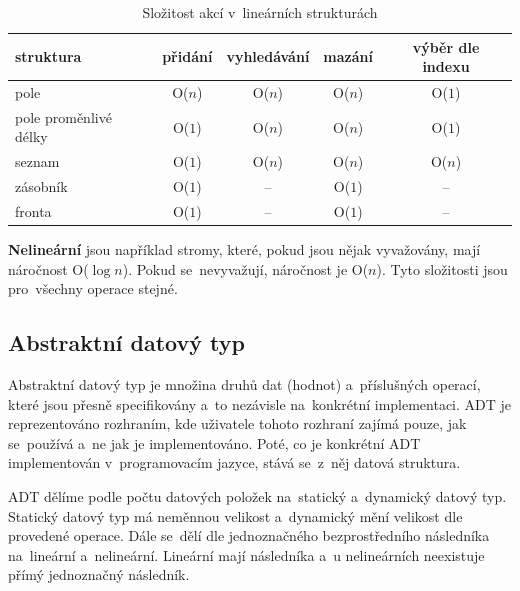 \begin{table}[h]
	\centering
	\caption{Složitost akcí v~lineárních strukturách}
	\begin{tabular}{|l||c|c|c|c|}\hline
		struktura             & přidání    & vyhledávání & mazání     & výběr dle indexu \\\hline\hline
		pole                  & O(\( n \)) & O(\( n \))  & O(\( n \)) & O(\( 1 \))       \\\hline
		pole proměnlivé délky & O(\( 1 \)) & O(\( n \))  & O(\( n \)) & O(\( 1 \))       \\\hline
		seznam                & O(\( 1 \)) & O(\( n \))  & O(\( n \)) & O(\( n \))       \\\hline
		zásobník              & O(\( 1 \)) & --          & O(\( 1 \)) & --               \\\hline
		fronta                & O(\( 1 \)) & --          & O(\( 1 \)) & --               \\\hline
	\end{tabular}
\end{table}

\textbf{Nelineární} jsou například stromy, které, pokud jsou nějak vyvažovány, mají náročnost O(\( \log{n} \)). Pokud se~nevyvažují, náročnost je O(\( n \)). Tyto složitosti jsou pro~všechny operace stejné.


\subsection{Abstraktní datový typ}

Abstraktní datový typ je množina druhů dat (hodnot) a~příslušných operací, které jsou přesně specifikovány a~to nezávisle na~konkrétní implementaci. ADT je reprezentováno rozhraním, kde uživatele tohoto rozhraní zajímá pouze, jak se~používá a~ne jak je implementováno. Poté, co je konkrétní ADT implementován v~programovacím jazyce, stává se~z~něj datová struktura.

ADT dělíme podle počtu datových položek na~statický a~dynamický datový typ. Statický datový typ má neměnnou velikost a~dynamický mění velikost dle provedené operace. Dále se~dělí dle jednoznačného bezprostředního následníka na~lineární a~nelineární. Lineární mají následníka a~u nelineárních neexistuje přímý jednoznačný následník.


